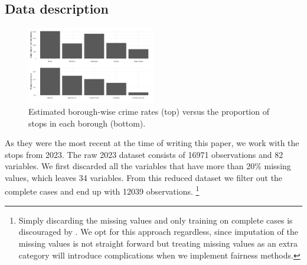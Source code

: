 
\subsection{Data description}
\begin{figure}
    \includegraphics[width=0.5\textwidth]{../figures/sqf_case_study_plot14.png}
    \caption{Estimated borough-wise crime rates (top) versus the proportion of stops in each borough (bottom).}
    \label{fig:nyc_pop_crimerates_stops_comparison}
\end{figure}

As they were the most recent at the time of writing this paper, we work with the stops from 2023. The raw 2023 dataset consists of 16971 observations and 82 variables. We first discarded all the variables that have more than 20\% missing values, which leaves 34 variables.
From this reduced dataset we filter out the complete cases and end up with 12039 observations. \footnote{Simply discarding the missing values and only training on complete cases is discouraged by \cite{fernando2021}. We opt for this approach regardless, since imputation of the missing values is not straight forward
but treating missing values as an extra category will introduce complications when we implement fairness methods.} \\

